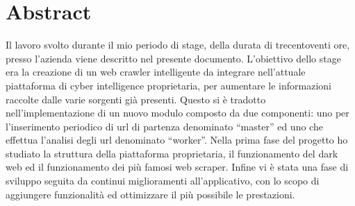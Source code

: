 
\cleardoublepage
{}
{}
\begingroup
\let\clearpage\relax
\let\cleardoublepage\relax
\let\cleardoublepage\relax

\chapter*{Abstract}

Il lavoro svolto durante il mio periodo di stage, della durata di trecentoventi ore, presso l'azienda \myCompany{} \myCompanyRag{} viene descritto nel presente documento.
L'obiettivo dello stage era la creazione di un web crawler intelligente da integrare nell’attuale piattaforma di cyber intelligence proprietaria, per aumentare le informazioni raccolte dalle varie sorgenti già presenti. Questo si è tradotto nell'implementazione di un nuovo modulo composto da due componenti: uno per l'inserimento periodico di url di partenza denominato ``master'' ed uno che effettua l'analisi degli url denominato ``worker''. \newline{}
Nella prima fase del progetto ho studiato la struttura della piattaforma proprietaria, il funzionamento del dark web ed il funzionamento dei più famosi web scraper. Infine vi è stata una fase di sviluppo seguita da continui miglioramenti all'applicativo, con lo scopo di aggiungere funzionalità ed ottimizzare il più possibile le prestazioni.

%
%

\endgroup			

\vfill

